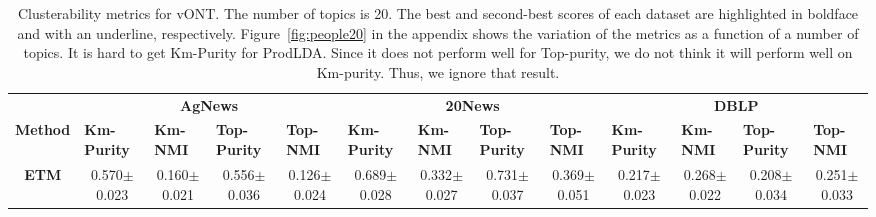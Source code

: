 \documentclass[11pt]{article}
\begin{document}
\begin{table*}[ ]
\caption{\label{tab:people20} Clusterability metrics for vONT. The number of topics is 20. The best and second-best scores of each dataset are highlighted in boldface and with an underline, respectively. Figure~\ref{fig:people20} in the appendix shows the variation of the metrics as a function of a number of topics. It is hard to get Km-Purity for ProdLDA. Since it does not perform well for Top-purity, we do not think it will perform well on Km-purity. Thus, we ignore that result.}

\scalebox{0.49} {
\centering
\begin{tabular}{c|cccc|cccc|cccc|}
\hline
\multicolumn{1}{r}{}\vline &
\multicolumn{4}{c}{\textbf{AgNews}}\vline  & \multicolumn{4}{c}{\textbf{20News}} \vline & \multicolumn{4}{c}{\textbf{DBLP}}\vline\\                                                                                                                                                                                                                       

\multicolumn{1}{l}{\textbf{Method}} \vline & \multicolumn{1}{l}{\textbf{Km-Purity}} & \multicolumn{1}{l}{\textbf{Km-NMI}} & \multicolumn{1}{l}{\textbf{Top-Purity}} & \multicolumn{1}{l}{\textbf{Top-NMI}} \vline& \multicolumn{1}{l}{\textbf{Km-Purity}} & \multicolumn{1}{l}{\textbf{Km-NMI}} & \multicolumn{1}{l}{\textbf{Top-Purity}} & \multicolumn{1}{l}{\textbf{Top-NMI}} \vline& \multicolumn{1}{l}{\textbf{Km-Purity}} & \multicolumn{1}{l}{\textbf{Km-NMI}} & \multicolumn{1}{l}{\textbf{Top-Purity}} & \multicolumn{1}{l}{\textbf{Top-NMI}} \vline\\
\hline
\textbf{ETM}                                               & 0.570$\pm$0.023                                                    & 0.160$\pm$0.021                                                 & 0.556$\pm$0.036                                                     & 0.126$\pm$0.024                                                  & 0.689$\pm$0.028                                                    & 0.332$\pm$0.027                                                 & 0.731$\pm$0.037                                                     & 0.369$\pm$0.051                                                  & 0.217$\pm$0.023                                                    & 0.268$\pm$0.022                                                 & 0.208$\pm$0.034                                                     & 0.251$\pm$0.033                                                  \\


\end{tabular}}
\end{table*}
\end{document}
